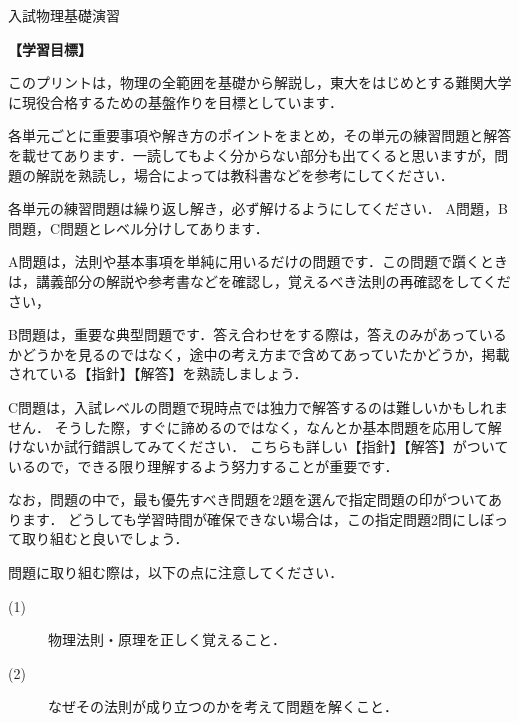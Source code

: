 \documentclass[a4j,10pt]{jsarticle}
\begin{document}
\renewcommand{\thenombre}{\arabic{nombre}} %
\setcounter{nombre}{0} %

\newcommand{\ex}[1][]{\refstepcounter{nombre}#1【例題 \thenombre】}

\renewcommand{\thenomber}{\arabic{nomber}} %
\setcounter{nomber}{0} %

\newcommand{\prob}[1][]{\refstepcounter{nomber}#1【問題 \thenomber】}

\newcommand{\MARU}[1]{{\ooalign{\hfil#1\/\hfil\crcr\raise.167ex\hbox{\mathhexbox20D}}}}

\def\heiko{\mathrel{\raise.3ex\hbox{\scalebox{.7}{%
    \rotatebox[origin=c]{-7}{/}%
    \kern-.35em\rotatebox[origin=c]{-7}{/}}}}}%
    
\newpage

{\huge 入試物理基礎演習}
\vspace{5mm}

{\bf【学習目標】}

このプリントは，物理の全範囲を基礎から解説し，東大をはじめとする難関大学に現役合格するための基盤作りを目標としています．

各単元ごとに重要事項や解き方のポイントをまとめ，その単元の練習問題と解答を載せてあります．一読してもよく分からない部分も出てくると思いますが，問題の解説を熟読し，場合によっては教科書などを参考にしてください．

各単元の練習問題は繰り返し解き，必ず解けるようにしてください．
A問題，B問題，C問題とレベル分けしてあります．

A問題は，法則や基本事項を単純に用いるだけの問題です．この問題で躓くときは，講義部分の解説や参考書などを確認し，覚えるべき法則の再確認をしてください，

B問題は，重要な典型問題です．答え合わせをする際は，答えのみがあっているかどうかを見るのではなく，途中の考え方まで含めてあっていたかどうか，掲載されている【指針】【解答】を熟読しましょう．

C問題は，入試レベルの問題で現時点では独力で解答するのは難しいかもしれません．
そうした際，すぐに諦めるのではなく，なんとか基本問題を応用して解けないか試行錯誤してみてください．
こちらも詳しい【指針】【解答】がついているので，できる限り理解するよう努力することが重要です．

なお，問題の中で，最も優先すべき問題を2題を選んで指定問題の印がついてあります．
どうしても学習時間が確保できない場合は，この指定問題2問にしぼって取り組むと良いでしょう．

問題に取り組む際は，以下の点に注意してください．
\begin{description}
\item[(1)] $物理法則・原理を正しく覚えること．$
\item[(2)] $なぜその法則が成り立つのかを考えて問題を解くこと．$
\end{description}
\end{document}
